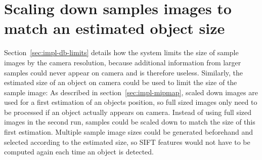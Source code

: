 \section*{Scaling down samples images to match an estimated object size}
Section~\ref{sec:impl-db-limits} details how the system limits the size of sample images by the camera resolution, because additional information from larger samples could never appear on camera and is therefore useless. Similarly, the estimated size of an object on camera could be used to limit the size of the sample image: As described in section~\ref{sec:impl-mipmap}, scaled down images are used for a first estimation of an objects position, so full sized images only need to be processed if an object actually appears on camera. Instead of using full sized images in the second run, samples could be scaled down to match the size of this first estimation. Multiple sample image sizes could be generated beforehand and selected according to the estimated size, so SIFT features would not have to be computed again each time an object is detected.
